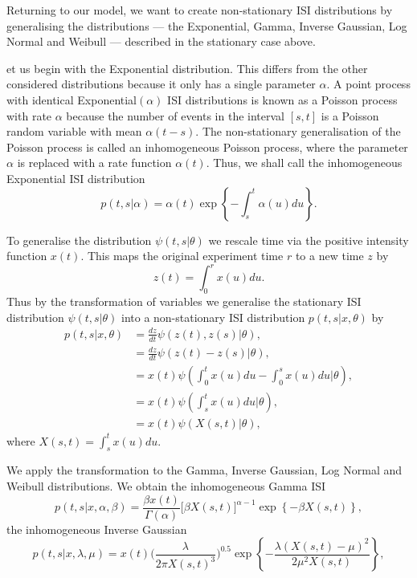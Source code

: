 \documentclass[../main.tex]{subfiles}
\begin{document}

Returning to our model, we want to create non-stationary ISI distributions by generalising the distributions --- the Exponential, Gamma, Inverse Gaussian, Log Normal and Weibull --- described in the stationary case above. 

 et us begin with the Exponential distribution. This differs from the other considered distributions because it only has a single parameter $\alpha$. A point process with identical Exponential$(\alpha)$ ISI distributions is known as a Poisson process with rate $\alpha$ because the  number of events in the interval $[s,t]$ is a Poisson random variable with mean $\alpha (t-s)$. The non-stationary generalisation of the Poisson process is called an inhomogeneous Poisson process, where the parameter $\alpha$ is replaced with a rate function $\alpha(t)$. Thus, we shall call the inhomogeneous  Exponential ISI distribution
$$ p(t,s|\alpha) = \alpha(t) \exp \left\{ -\int^t_s \alpha(u) du \right\}. $$

 To generalise the distribution $\psi(t,s|\theta)$ we rescale time via the positive intensity function $x(t)$. This maps the original experiment time $r$ to a new time $z$ by
 $$ z(t) =\int^r_0 x(u) du. $$
 Thus by the transformation of variables we generalise the stationary ISI distribution $\psi(t,s|\theta)$ into a non-stationary ISI distribution $p(t,s| x, \theta)$ by
\begin{align*}
	p(t,s |x,\theta) &= \frac{dz}{dt} \psi (z(t),z(s)|\theta), \\
	&= \frac{dz}{dt} \psi (z(t) - z(s)|\theta),\\
	&= x(t) \psi (\int^t_0 x(u) du - \int^s_0 x(u) du|\theta), \\
	&= x(t)\psi (\int^t_s x(u)du|\theta),\\
	&= x(t)\psi (X(s,t)|\theta),
\end{align*} 
where $X(s,t) = \int^t_s x(u)du.$

We apply the transformation to the Gamma, Inverse Gaussian, Log Normal and Weibull distributions. We obtain the  inhomogeneous Gamma ISI
$$
 p(t,s| x, \alpha, \beta) =  \frac{\beta x(t)}{\Gamma ( \alpha )} \big[ \beta X(s,t) \big]^{\alpha -1} \exp \left\{ - \beta X(s,t)  \right\},
$$
 the inhomogeneous Inverse Gaussian
 $$
  p(t,s | x,\lambda, \mu) =  x(t) \bigg( \frac{\lambda}{2\pi X(s,t)^3} \bigg)^{0.5} \exp \left\{ -\frac{\lambda(X(s,t)-\mu)^2}{2 \mu ^2 X(s,t)} \right\},
 $$
 
\end{document}
